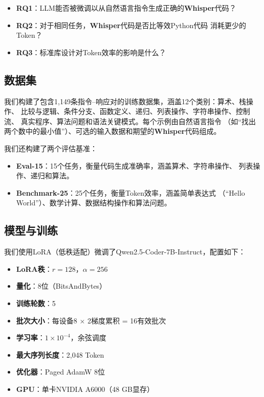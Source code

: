\documentclass[11pt,a4paper]{ctexart}
\begin{document}
\begin{itemize}
\item \textbf{RQ1}：LLM能否被微调以从自然语言指令生成正确的\textbf{Whisper}代码？
\item \textbf{RQ2}：对于相同任务，\textbf{Whisper}代码是否比等效Python代码
  消耗更少的Token？
\item \textbf{RQ3}：标准库设计对Token效率的影响是什么？
\end{itemize}

\subsection{数据集}

我们构建了包含1,149条指令--响应对的训练数据集，涵盖12个类别：算术、栈操作、
比较与逻辑、条件分支、函数定义、递归、列表操作、字符串操作、控制流、
真实程序、算法问题和语法关键模式。每个示例由自然语言指令
（如``找出两个数中的最小值''）、可选的输入数据和期望的\textbf{Whisper}代码组成。

我们还构建了两个评估基准：

\begin{itemize}
\item \textbf{Eval-15}：15个任务，衡量代码生成准确率，涵盖算术、字符串操作、
  列表操作、递归和算法。
\item \textbf{Benchmark-25}：25个任务，衡量Token效率，涵盖简单表达式
  （``Hello World''）、数学计算、数据结构操作和算法问题。
\end{itemize}

\subsection{模型与训练}

我们使用LoRA（低秩适配）微调了Qwen2.5-Coder-7B-Instruct，配置如下：

\begin{itemize}
\item \textbf{LoRA秩}：$r = 128$，$\alpha = 256$
\item \textbf{量化}：8位（BitsAndBytes）
\item \textbf{训练轮数}：5
\item \textbf{批次大小}：每设备8 $\times$ 2梯度累积 = 16有效批次
\item \textbf{学习率}：$1 \times 10^{-4}$，余弦调度
\item \textbf{最大序列长度}：2,048 Token
\item \textbf{优化器}：Paged AdamW 8位
\item \textbf{GPU}：单卡NVIDIA A6000（48 GB显存）
\end{itemize}
\end{document}
